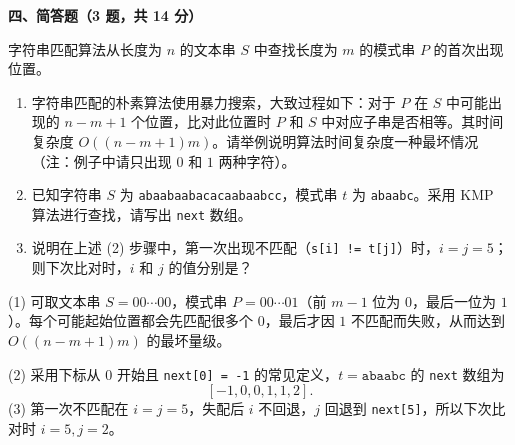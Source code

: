 \textbf{四、简答题（3 题，共 14 分）}

\begin{question}
字符串匹配算法从长度为 $n$ 的文本串 $S$ 中查找长度为 $m$ 的模式串 $P$ 的首次出现位置。
\begin{enumerate}
  \item 字符串匹配的朴素算法使用暴力搜索，大致过程如下：对于 $P$ 在 $S$ 中可能出现的 $n-m+1$ 个位置，比对此位置时 $P$ 和 $S$ 中对应子串是否相等。其时间复杂度 $O((n-m+1)m)$。请举例说明算法时间复杂度一种最坏情况（注：例子中请只出现 $0$ 和 $1$ 两种字符）。
  \item 已知字符串 $S$ 为 \texttt{abaabaabacacaabaabcc}，模式串 $t$ 为 \texttt{abaabc}。采用 KMP 算法进行查找，请写出 \texttt{next} 数组。
  \item 说明在上述 (2) 步骤中，第一次出现不匹配（\texttt{s[i] != t[j]}）时，$i=j=5$；则下次比对时，$i$ 和 $j$ 的值分别是？
\end{enumerate}
\begin{solution}
(1) 可取文本串 $S=00\cdots 00$，模式串 $P=00\cdots 01$（前 $m-1$ 位为 $0$，最后一位为 $1$）。每个可能起始位置都会先匹配很多个 $0$，最后才因 $1$ 不匹配而失败，从而达到 $O((n-m+1)m)$ 的最坏量级。\par
(2) 采用下标从 $0$ 开始且 \texttt{next[0] = -1} 的常见定义，$t=\texttt{abaabc}$ 的 \texttt{next} 数组为
\[
[-1,0,0,1,1,2].
\]
(3) 第一次不匹配在 $i=j=5$，失配后 $i$ 不回退，$j$ 回退到 \texttt{next[5]}，所以下次比对时 $i=5,j=2$。
\end{solution}
\end{question}

